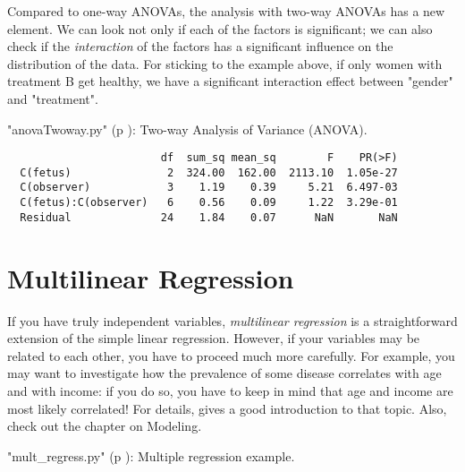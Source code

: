 Compared to one-way ANOVAs, the analysis with two-way ANOVAs has a new element. We can look not only if each of the factors is significant; we can also check if the \emph{interaction} of the factors has a significant influence on the distribution of the data. For sticking to the example above, if only women with treatment B get healthy, we have a significant interaction effect between "gender" and "treatment".

\PyImg "anovaTwoway.py" (p \pageref{py:anovaTwoway}): Two-way Analysis of Variance (ANOVA).

\begin{verbatim}
                        df  sum_sq mean_sq        F    PR(>F)
  C(fetus)               2  324.00  162.00  2113.10  1.05e-27
  C(observer)            3    1.19    0.39     5.21  6.497-03
  C(fetus):C(observer)   6    0.56    0.09     1.22  3.29e-01
  Residual              24    1.84    0.07      NaN       NaN
\end{verbatim}

\section{Multilinear Regression} 

If you have truly independent variables, \emph{multilinear regression} is a straightforward extension of the simple linear regression. However, if your variables may be related to each other, you have to proceed much more carefully. For example, you may want to investigate how the prevalence of some disease correlates with age and with income: if you do so, you have to keep in mind that age and income are most likely correlated! For details, \cite{Kaplan2009} gives a good introduction to that topic. Also, check out the chapter on Modeling.

\PyImg "mult\_regress.py" (p \pageref{py:mult_regress}): Multiple regression example.
